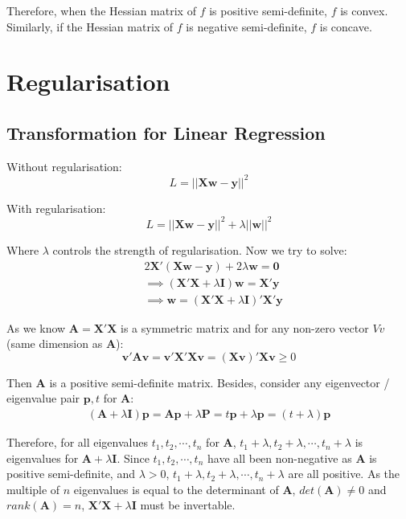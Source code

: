 \documentclass{article}
\newcommand{\V}[1]{\boldsymbol{#1}}
\begin{document}
Therefore, when the Hessian matrix of \(f\) is positive semi-definite, \(f\) is
convex. Similarly, if the Hessian matrix of \(f\) is negative semi-definite,
\(f\) is concave.

\section{Regularisation}
\subsection{Transformation for Linear Regression}
Without regularisation:
\begin{equation}
L=||\mathbf{X}\V{w}-\V{y}||^2
\end{equation}

With regularisation:
\begin{equation}
L=||\mathbf{X}\V{w}-\V{y}||^2+\lambda||\V{w}||^2
\end{equation}

Where \(\lambda\) controls the strength of regularisation. Now we try to solve:
\begin{equation}
\begin{aligned}
&2\mathbf{X}'(\mathbf{X}\V{w}-\V{y})+2\lambda \V{w}=\V{0}\\
&\implies (\mathbf{X}'\mathbf{X}+\lambda \mathbf{I})\V{w}=\mathbf{X}'\V{y}\\
&\implies \V{w}=(\mathbf{X}'\mathbf{X}+\lambda \mathbf{I})'\mathbf{X}'\V{y}
\end{aligned}
\end{equation}

As we know \(\mathbf{A}=\mathbf{X}'\mathbf{X}\) is a symmetric matrix and for any non-zero vector \(V{v}\)
(same dimension as \(\mathbf{A}\)):
\begin{equation}
\V{v'}\mathbf{A}\V{v}=\V{v'}\mathbf{X}'\mathbf{X}\V{v}=(\mathbf{X}\V{v})'\mathbf{X}\V{v}\geq 0
\end{equation}

Then \(\mathbf{A}\) is a positive semi-definite matrix. Besides, consider
any eigenvector / eigenvalue pair \(\V{p}, t\) for \(\mathbf{A}\):
\begin{equation}
\begin{split}
(\mathbf{A}+\lambda\mathbf{I})\V{p}=\mathbf{A}\V{p}+\lambda\V{P}
=t\V{p}+\lambda\V{p}=(t+\lambda)\V{p}
\end{split}
\end{equation}

Therefore, for all eigenvalues \(t_1, t_2, \cdots, t_n\) for \(\mathbf{A}\),
\(t_1+\lambda, t_2+\lambda, \cdots, t_n+\lambda\) is eigenvalues for
\(\mathbf{A}+\lambda\mathbf{I}\). Since \(t_1, t_2, \cdots, t_n\) have all been
non-negative as \(\mathbf{A}\) is positive semi-definite, and \(\lambda>0\), \(t_1+\lambda, t_2+\lambda, \cdots, t_n+\lambda\)
are all positive. As the multiple of \(n\) eigenvalues is equal to the
determinant of \(\mathbf{A}\), \(det(\mathbf{A})\neq 0\) and \(rank(\mathbf{A})=n\),
\(\mathbf{X}'\mathbf{X}+\lambda\mathbf{I}\) must be invertable.
\end{document}

